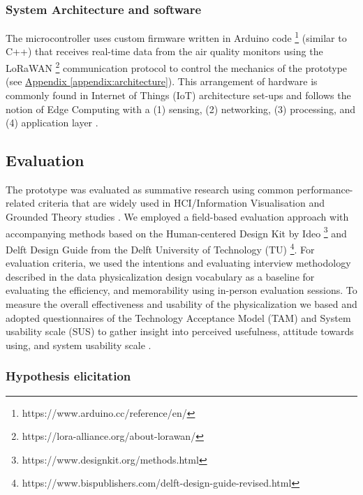 \subsubsection{System Architecture and software}

The microcontroller uses custom firmware written in Arduino code \footnote{https://www.arduino.cc/reference/en/} (similar to C++) that receives real-time data from the air quality monitors using the LoRaWAN \footnote{https://lora-alliance.org/about-lorawan/} communication protocol to control the mechanics of the prototype (see \hyperref[appendix:architecture]{Appendix \ref*{appendix:architecture}}). This arrangement of hardware is commonly found in Internet of Things (IoT) architecture set-ups and follows the notion of Edge Computing with a (1) sensing, (2) networking, (3) processing, and (4) application layer \cite{li_edge-oriented_2019, idrees_edge_2018}.

\subsection{Evaluation}
\label{sec:evaluation}

The prototype was evaluated as summative research using common performance-related criteria that are widely used in HCI/Information Visualisation \cite{ranasinghe_encoding_2023} and Grounded Theory studies \cite{chun_tie_grounded_2019}. We employed a field-based evaluation approach with accompanying methods based on the Human-centered Design Kit by Ideo \footnote{https://www.designkit.org/methods.html} and Delft Design Guide from the Delft University of Technology (TU) \footnote{https://www.bispublishers.com/delft-design-guide-revised.html}. For evaluation criteria, we used the intentions and evaluating interview methodology described in the data physicalization design vocabulary \cite{jansen_evaluating_2013,ranasinghe_encoding_2023} as a baseline for evaluating the efficiency, and memorability using in-person evaluation sessions. To measure the overall effectiveness and usability of the physicalization we based and adopted questionnaires of the Technology Acceptance Model (TAM) and System usability scale (SUS) to gather insight into perceived usefulness, attitude towards using, and system usability scale \cite{davis_perceived_1989, brooke_sus_1996}. 

\subsubsection{Hypothesis elicitation}


